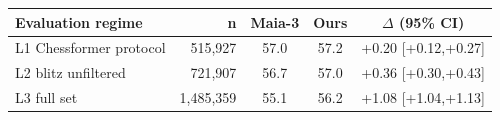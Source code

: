 \begin{tabular}{lrccc}
\hline
\textbf{Evaluation regime} & \textbf{n} & \textbf{Maia-3} & \textbf{Ours} & $\Delta$ (95\% CI) \\
\hline
L1 Chessformer protocol & 515,927 & 57.0 & 57.2 & +0.20 [+0.12,+0.27] \\
L2 blitz unfiltered & 721,907 & 56.7 & 57.0 & +0.36 [+0.30,+0.43] \\
L3 full set & 1,485,359 & 55.1 & 56.2 & +1.08 [+1.04,+1.13] \\
\hline
\end{tabular}
